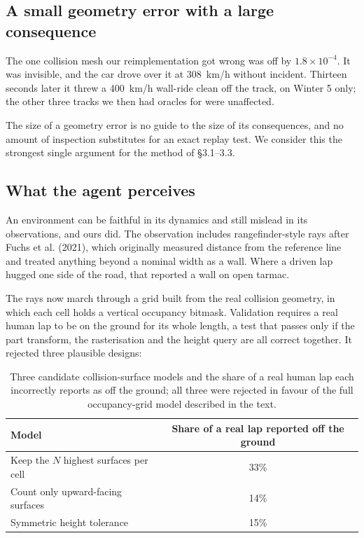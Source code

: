 \documentclass[11pt]{article}
\begin{document}
\subsection{A small geometry error with a large consequence}

The one collision mesh our reimplementation got wrong was off by $1.8 \times 10^{-4}$. It was invisible, and the car drove over it at 308~km/h without incident. Thirteen seconds later it threw a 400~km/h wall-ride clean off the track, on Winter 5 only; the other three tracks we then had oracles for were unaffected.

The size of a geometry error is no guide to the size of its consequences, and no amount of inspection substitutes for an exact replay test. We consider this the strongest single argument for the method of \S3.1--3.3.

\subsection{What the agent perceives}

An environment can be faithful in its dynamics and still mislead in its observations, and ours did. The observation includes rangefinder-style rays after Fuchs et al. (2021), which originally measured distance from the reference line and treated anything beyond a nominal width as a wall. Where a driven lap hugged one side of the road, that reported a wall on open tarmac.

The rays now march through a grid built from the real collision geometry, in which each cell holds a vertical occupancy bitmask. Validation requires a real human lap to be on the ground for its whole length, a test that passes only if the part transform, the rasterisation and the height query are all correct together. It rejected three plausible designs:

\begin{table}[h]
\centering
\begin{tabular}{@{}lc@{}}
\toprule
\textbf{Model} & \textbf{Share of a real lap reported off the ground} \\
\midrule
Keep the $N$ highest surfaces per cell & 33\% \\
Count only upward-facing surfaces & 14\% \\
Symmetric height tolerance & 15\% \\
\bottomrule
\end{tabular}
\caption{Three candidate collision-surface models and the share of a real human lap each incorrectly reports as off the ground; all three were rejected in favour of the full occupancy-grid model described in the text.}
\label{tab:groundmodel}
\end{table}
\end{document}
